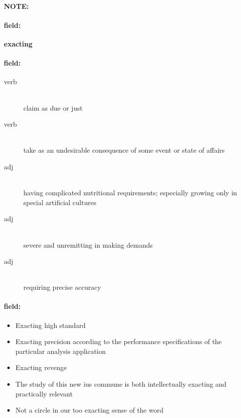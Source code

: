 \documentclass[12pt]{article}
\newenvironment{note}{\paragraph{NOTE:}}{}
\newenvironment{field}{\paragraph{field:}}{}
\begin{document}
\begin{note}
\begin{field}
\textbf{\large exacting}
\end{field}


\begin{field}
\begin{description}
\item[verb] \hfill \\ 
claim as due or just

\item[verb] \hfill \\ 
take as an undesirable consequence of some event or state of affairs

\item[adj] \hfill \\ 
having complicated nutritional requirements; especially growing only in special artificial cultures

\item[adj] \hfill \\ 
severe and unremitting in making demands

\item[adj] \hfill \\ 
requiring precise accuracy

\end{description}
\end{field}

\begin{field}
\begin{itemize}
\item Exacting high standard
\item Exacting precision according to the performance specifications of the particular analysis application
\item Exacting revenge
\item The study of this new ius commune is both intellectually exacting and practically relevant
\item Not a circle in our too exacting sense of the word
\end{itemize}
\end{field}
\end{note}
\end{document}

